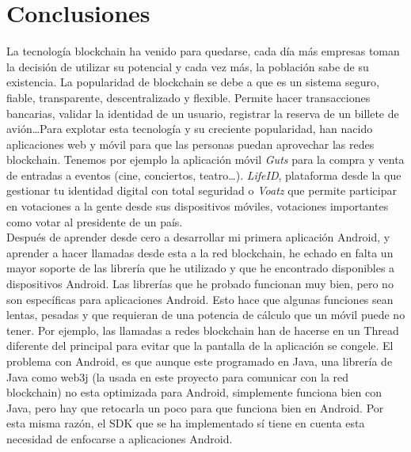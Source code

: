 \chapter{Conclusiones}
\label{cap:Conclusiones}

La tecnología blockchain ha venido para quedarse, cada día más empresas toman la decisión de utilizar su potencial y cada vez más, la población sabe de su existencia. La popularidad de blockchain se debe a que es un sistema seguro, fiable, transparente, descentralizado y flexible. Permite hacer transacciones bancarias, validar la identidad de un usuario, registrar la reserva de un billete de avión\dots Para explotar esta tecnología y su creciente popularidad, han nacido aplicaciones web y móvil para que las personas puedan aprovechar las redes blockchain. Tenemos por ejemplo la aplicación móvil \emph{Guts} para la compra y venta de entradas a eventos (cine, conciertos, teatro\dots). \emph{LifeID}, plataforma desde la que gestionar tu identidad digital con total seguridad o \emph{Voatz} que permite participar en votaciones a la gente desde sus dispositivos móviles, votaciones importantes como votar al presidente de un país. \\

Después de aprender desde cero a desarrollar mi primera aplicación Android, y aprender a hacer llamadas desde esta a la red blockchain, he echado en falta un mayor soporte de las librería que he utilizado y que he encontrado disponibles a dispositivos Android. Las librerías que he probado funcionan muy bien, pero no son específicas para aplicaciones Android. Esto hace que algunas funciones sean lentas, pesadas y que requieran de una potencia de cálculo que un móvil puede no tener. Por ejemplo, las llamadas a redes blockchain han de hacerse en un Thread diferente del principal para evitar que la pantalla de la aplicación se congele. El problema con Android, es que aunque este programado en Java, una librería de Java como web3j (la usada en este proyecto para comunicar con la red blockchain) no esta optimizada para Android, simplemente funciona bien con Java, pero hay que retocarla un poco para que funciona bien en Android. Por esta misma razón, el SDK que se ha implementado sí tiene en cuenta esta necesidad de enfocarse a aplicaciones Android. \\

